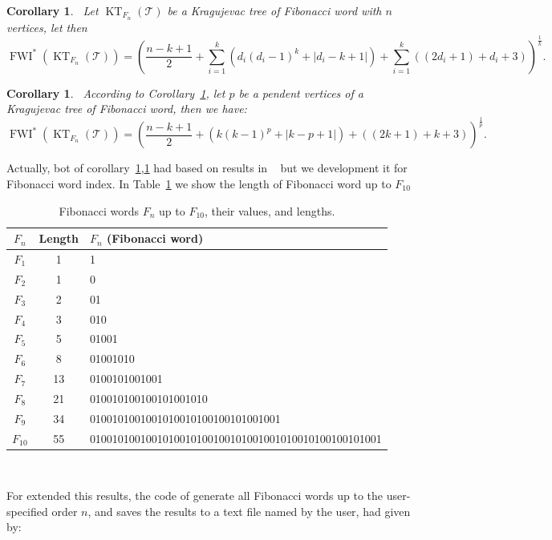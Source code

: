 \documentclass[12pt, a4paper]{article}
\newtheorem{corollary}[theorem]{Corollary}
\begin{document}
\begin{corollary}~\label{corn1}
Let $\operatorname{KT}_{F_n}(\mathscr{T})$ be a Kragujevac tree of Fibonacci word with $n$ vertices, let  then
\[
\operatorname{FWI}^*(\operatorname{KT}_{F_n}(\mathscr{T}))=\left(\frac{n-k+1}{2}+\sum_{i=1}^{k}\left(d_i(d_i-1)^k+\lvert d_i-k+1\rvert\right)+\sum_{i=1}^{k}\left((2d_i+1)+d_i+3\right)\right)^{\frac{1}{k}}.
\]
\end{corollary}
\begin{corollary}~\label{corn2}
According to Corollary~\ref{corn1}, let $p$ be a pendent vertices of a Kragujevac tree of Fibonacci word, then we have: 
\[
\operatorname{FWI}^*(\operatorname{KT}_{F_n}(\mathscr{T}))=\left(\frac{n-k+1}{2}+\left(k(k-1)^p+\lvert k-p+1\rvert\right)+\left((2k+1)+k+3\right)\right)^{\frac{1}{p}}.
\]
\end{corollary}
Actually, bot of corollary~\ref{corn1},\ref{corn2} had based on results in ~\cite{HosseiniGutmanAhmadi} but we development it for Fibonacci word index. In Table~\ref{tabn1} we show the length of Fibonacci word up to $F_{10}$
\begin{table}[H]
\centering
\renewcommand{\arraystretch}{1.2}
\begin{tabular}{|c|c|l|}
\hline
$F_n$ & Length & $F_n$ (Fibonacci word)\\
\hline
$F_1$ & 1 & 1  \\ \hline
$F_2$ & 1 & 0  \\ \hline
$F_3$ & 2 & 01  \\ \hline
$F_4$ & 3 & 010 \\ \hline
$F_5$ & 5 & 01001  \\\hline
$F_6$ & 8 & 01001010  \\\hline
$F_7$ & 13 & 0100101001001  \\\hline
$F_8$ & 21 & 010010100100101001010  \\\hline
$F_9$ & 34 & 0100101001001010010100100101001001  \\\hline
$F_{10}$ & 55 & 0100101001001010010100100101001001010010100100101001 \\
\hline
\end{tabular}
\caption{Fibonacci words $F_n$ up to $F_{10}$, their values, and lengths.}~\label{tabn1}
\end{table}
For extended this results, the code of generate all Fibonacci words up to the user-specified order $n$, and saves the results to a text file named by the user, had given by: 
\end{document}
